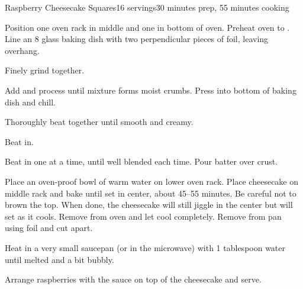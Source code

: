 \documentclass[../Cookbook.tex]{subfiles}
\begin{document}
\begin{recipe}{Raspberry Cheesecake Squares}{16 servings}{30 minutes prep, 55 minutes cooking}

Position one oven rack in middle and one in bottom of oven. Preheat oven to . Line an 8 glass baking dish with two perpendicular pieces of foil, leaving overhang.

Finely grind together.

Add and process until mixture forms moist crumbs. Press into bottom of baking dish and chill.

Thoroughly beat together until smooth and creamy.

Beat in.

Beat in one at a time, until well blended each time. Pour batter over crust.

Place an oven-proof bowl of warm water on lower oven rack. Place cheesecake on middle rack and bake until set in center, about 45--55 minutes. Be careful not to brown the top.
When done, the cheesecake will still jiggle in the center but will set as it cools.
Remove from oven and let cool completely. Remove from pan using foil and cut apart.

Heat in a very small saucepan (or in the microwave) with 1 tablespoon water until melted and a bit bubbly.

Arrange raspberries with the sauce on top of the cheesecake and serve.

\end{recipe}
\end{document}
